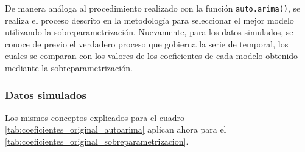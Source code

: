 \documentclass[
]{article}
\begin{document}
De manera análoga al procedimiento realizado con la función
\texttt{auto.arima()}, se realiza el proceso descrito en la metodología
para seleccionar el mejor modelo utilizando la sobreparametrización.
Nuevamente, para los datos simulados, se conoce de previo el verdadero
proceso que gobierna la serie de temporal, los cuales se comparan con
los valores de los coeficientes de cada modelo obtenido mediante la
sobreparametrización.

\subsubsection{Datos simulados}

Los mismos conceptos explicados para el cuadro
\ref{tab:coeficientes_original_autoarima} aplican ahora para el
\ref{tab:coeficientes_original_sobreparametrizacion}.
\end{document}
